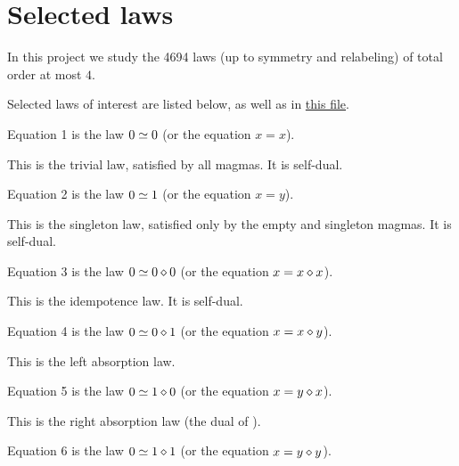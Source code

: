 \chapter{Selected laws}\label{subgraph-eq}

In this project we study the 4694 laws (up to symmetry and relabeling) of total order at most $4$.

Selected laws of interest are listed below, as well as in \href{https://github.com/teorth/equational_theories/blob/main/equational_theories/Equations.lean}{this file}.

\begin{definition}[Equation 1]\label{eq1}\leanok{}  Equation 1 is the law $0 \simeq 0$ (or the equation $x=x$).
\end{definition}

This is the trivial law, satisfied by all magmas. It is self-dual.


\begin{definition}[Equation 2]\label{eq2}\leanok{}  Equation 2 is the law $0 \simeq 1$ (or the equation $x=y$).
\end{definition}

This is the singleton law, satisfied only by the empty and singleton magmas.  It is self-dual.

\begin{definition}[Equation 3]\label{eq3}\leanok{}  Equation 3 is the law $0 \simeq 0 \diamond 0$ (or the equation $x = x \diamond x$).
\end{definition}

This is the idempotence law.  It is self-dual.

\begin{definition}[Equation 4]\label{eq4}\leanok{}  Equation 4 is the law $0 \simeq 0 \diamond 1$ (or the equation $x = x \diamond y$).
\end{definition}

This is the left absorption law.

\begin{definition}[Equation 5]\label{eq5}\leanok{}  Equation 5 is the law $0 \simeq 1 \diamond 0$ (or the equation $x = y \diamond x$).
\end{definition}

This is the right absorption law (the dual of ).

\begin{definition}[Equation 6]\label{eq6}\leanok{}  Equation 6 is the law $0 \simeq 1 \diamond 1$ (or the equation $x = y \diamond y$).
\end{definition}

